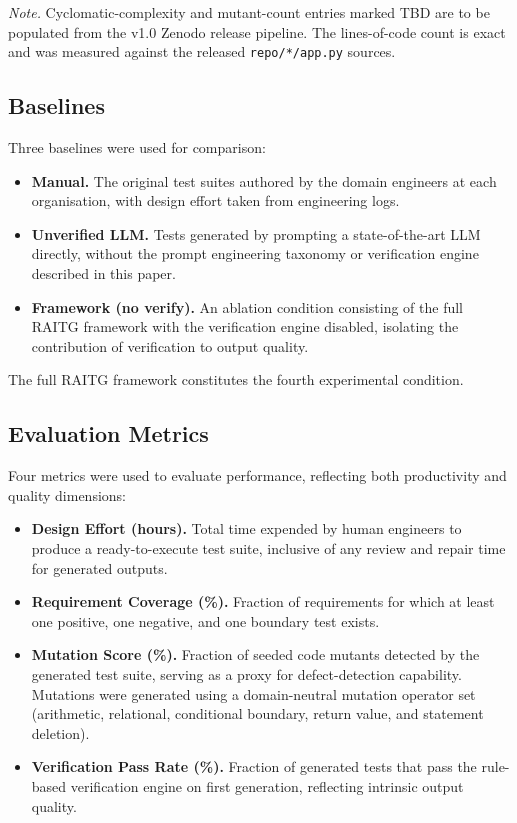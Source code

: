 \documentclass[conference]{IEEEtran}
\begin{document}
\textit{Note.} Cyclomatic-complexity and mutant-count entries marked TBD are to be populated from the v1.0 Zenodo release pipeline. The lines-of-code count is exact and was measured against the released \texttt{repo/*/app.py} sources.

\subsection{Baselines}

Three baselines were used for comparison:

\begin{itemize}
\item \textbf{Manual.} The original test suites authored by the domain engineers at each organisation, with design effort taken from engineering logs.
\item \textbf{Unverified LLM.} Tests generated by prompting a state-of-the-art LLM directly, without the prompt engineering taxonomy or verification engine described in this paper.
\item \textbf{Framework (no verify).} An ablation condition consisting of the full RAITG framework with the verification engine disabled, isolating the contribution of verification to output quality.
\end{itemize}

The full RAITG framework constitutes the fourth experimental condition.

\subsection{Evaluation Metrics}

Four metrics were used to evaluate performance, reflecting both productivity and quality dimensions:

\begin{itemize}
\item \textbf{Design Effort (hours).} Total time expended by human engineers to produce a ready-to-execute test suite, inclusive of any review and repair time for generated outputs.
\item \textbf{Requirement Coverage (\%).} Fraction of requirements for which at least one positive, one negative, and one boundary test exists.
\item \textbf{Mutation Score (\%).} Fraction of seeded code mutants detected by the generated test suite, serving as a proxy for defect-detection capability. Mutations were generated using a domain-neutral mutation operator set (arithmetic, relational, conditional boundary, return value, and statement deletion).
\item \textbf{Verification Pass Rate (\%).} Fraction of generated tests that pass the rule-based verification engine on first generation, reflecting intrinsic output quality.
\end{itemize}
\end{document}
